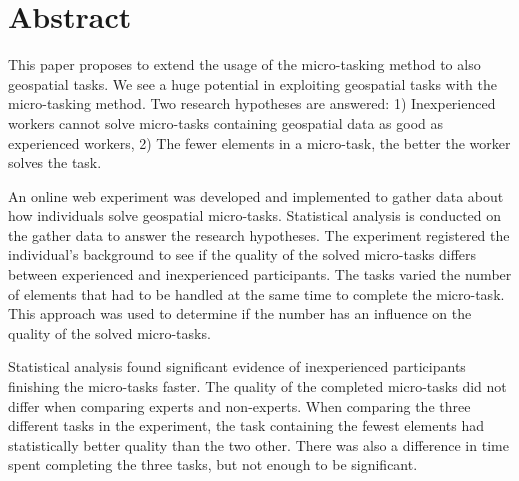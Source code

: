 \chapter*{Abstract}
%

This paper proposes to extend the usage of the micro-tasking method to also geospatial tasks. We see a huge potential in exploiting geospatial tasks with the micro-tasking method. Two research hypotheses are answered: 1) Inexperienced workers cannot solve micro-tasks containing geospatial data as good as experienced workers, 2) The fewer elements in a micro-task, the better the worker solves the task.

An online web experiment was developed and implemented to gather data about how individuals solve geospatial micro-tasks. Statistical analysis is conducted on the gather data to answer the research hypotheses. The experiment registered the individual's background to see if the quality of the solved micro-tasks differs between experienced and inexperienced participants. The tasks varied the number of elements that had to be handled at the same time to complete the micro-task. This approach was used to determine if the number has an influence on the quality of the solved micro-tasks. 

Statistical analysis found significant evidence of inexperienced participants finishing the micro-tasks faster. The quality of the completed micro-tasks did not differ when comparing experts and non-experts. When comparing the three different tasks in the experiment, the task containing the fewest elements had statistically better quality than the two other. There was also a difference in time spent completing the three tasks, but not enough to be significant.

